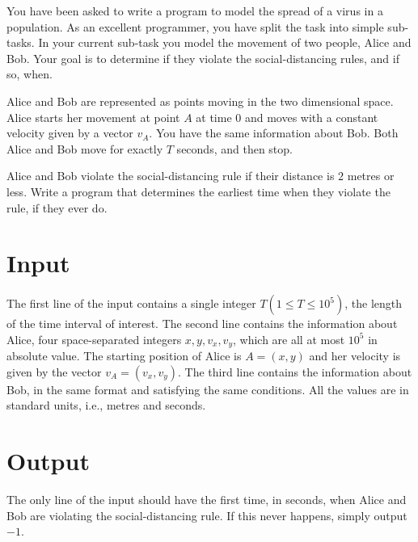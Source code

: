You have been asked to write a program to model the spread of a virus in a population.
As an excellent programmer, you have split the task into simple sub-tasks.
In your current sub-task you model the movement of two people, Alice and Bob.
Your goal is to determine if they violate the social-distancing rules, and if so, when.

Alice and Bob are represented as points moving in the two dimensional space.
Alice starts her movement at point $A$ at time $0$ and
moves with a constant velocity given by a vector $v_A$.
You have the same information about Bob.
Both Alice and Bob move for exactly $T$ seconds, and then stop.

Alice and Bob violate the social-distancing rule if their distance is $2$ metres or less.
Write a program that determines the earliest time when they violate the rule, if they ever do.

\section*{Input}
The first line of the input contains a single integer $T (1 \leq T \leq 10^5)$, the length of the time interval of interest.
The second line contains the information about Alice, four space-separated integers $x, y, v_x, v_y$,  which are all at most $10^5$ in absolute value.
The starting position of Alice is $A = (x, y)$ and her velocity is given by the vector $v_A = (v_x, v_y)$.
The third line contains the information about Bob, in the same format and satisfying the same conditions.
All the values are in standard units, i.e., metres and seconds.

\section*{Output}
The only line of the input should have the first time, in seconds,
when Alice and Bob are violating the social-distancing rule.
If this never happens, simply output $-1$.
